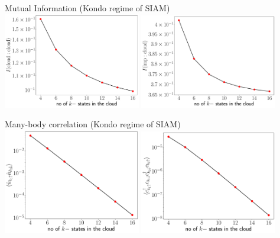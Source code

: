 \documentclass[aspectratio=169]{beamer}
\begin{document}
\begin{frame}[noframenumbering]{Mutual Information (Kondo regime of SIAM)}
	\includegraphics[width=0.45\textwidth]{figures/mut_I_ee.pdf}
	\includegraphics[width=0.45\textwidth]{figures/mut_I_ie.pdf}
\end{frame}

\begin{frame}[noframenumbering]{Many-body correlation (Kondo regime of SIAM)}
	\includegraphics[width=0.45\textwidth]{figures/corr_opp.pdf}
	\includegraphics[width=0.45\textwidth]{figures/corr_od.pdf}
\end{frame}
\end{document}
